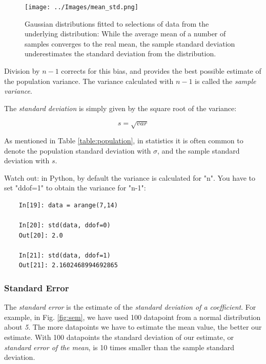 \begin{figure}[ht]
  \centering
  \texttt{[image: ../Images/mean\_std.png]}\\
  \caption{Gaussian distributions fitted to selections of data from the underlying distribution: While the average mean of a number of samples converges to the real mean, the sample standard deviation underestimates the standard deviation from the distribution.}\label{fig:mean_std}
\end{figure}

Division by $n-1$ corrects for this bias, and provides the best possible estimate of the population variance. The variance calculated with $n-1$ is called the \emph{sample variance}.


The \emph{standard deviation}  is simply given by the square root of the variance:

\begin{equation}
  s = \sqrt{var}
\end{equation}

As mentioned in Table \ref{table:population}, in statistics it is often common to denote the population standard deviation with $\sigma$, and the sample standard deviation with $s$.

Watch out: in Python, by default the variance is calculated for "n". You have to set "ddof=1" to obtain the variance for "n-1":

\begin{lstlisting}
    In[19]: data = arange(7,14)

    In[20]: std(data, ddof=0)
    Out[20]: 2.0

    In[21]: std(data, ddof=1)
    Out[21]: 2.1602468994692865
\end{lstlisting}

\subsubsection{Standard Error} 

The \emph{standard error} is the estimate of the \emph{standard deviation of a coefficient}. For example, in Fig. \ref{fig:sem}, we have used 100 datapoint from a normal distribution about \emph{5}. The more datapoints we have to estimate the mean value, the better our estimate. With 100 datapoints the standard deviation of our estimate, or \emph{standard error of the mean}, is 10 times smaller than the sample standard deviation.

